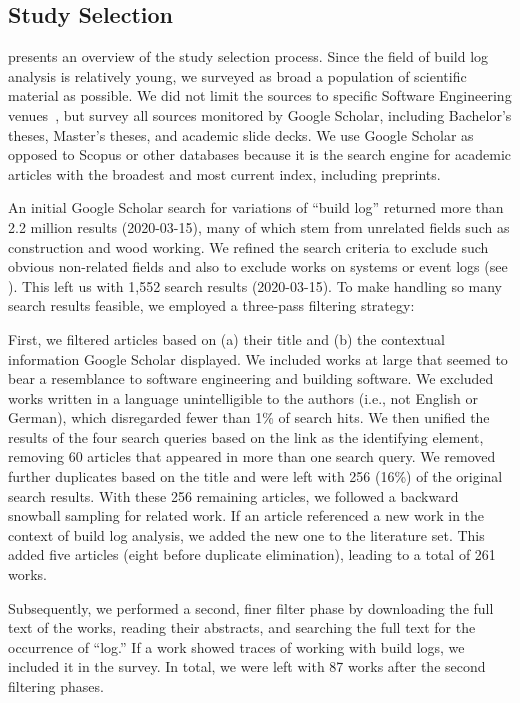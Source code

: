 \subsection{Study Selection}
 presents an overview of the study selection
process.
Since the field of build log analysis is relatively young, we
surveyed as broad a population of scientific material as possible.
We did not limit the sources to specific Software Engineering
venues~\cite{petersen2015guidelines}, but survey all sources
monitored by Google Scholar, including Bachelor's theses, Master's
theses, and academic slide decks.
We use Google Scholar as opposed to Scopus or
other databases because it is the search engine for academic articles with
the broadest and most current index, including preprints.

An initial Google Scholar search for variations of ``build log''
returned more than 2.2 million results (2020-03-15), many of which stem
from unrelated fields such as construction and wood working.
We refined the search criteria to exclude such obvious
non-related fields and also to exclude works on systems
or event logs (see ).
This left us with 1,552 search results
(2020-03-15).
To make handling so many search results feasible, we employed a
three-pass filtering strategy:

First, we filtered articles based on (a) their title and (b) the
contextual information Google Scholar displayed.
We included works at large that seemed to bear a resemblance to software
engineering and building software.
We excluded works written in a language unintelligible to the authors
(i.e., not English or German), which disregarded fewer than 1\% of search
hits.
We then unified
the results of the four search queries based on the link as the
identifying element, removing 60 articles that appeared in more than
one search query.
We removed further duplicates based on the title and were
left with 256 (16\%) of the original search results.
With these 256 remaining articles, we followed a backward snowball
sampling for related work.
If an article referenced a new work in the context
of build log analysis, we added the new one to the literature set.
This added five articles (eight before
duplicate elimination), leading to a total of 261
works.

Subsequently, we performed a second, finer filter phase by downloading the
full text of the works, reading their abstracts, and searching the
full text
for the occurrence of ``log.''
If a work showed traces of
working with build logs, we included it in the survey.
In total, we
were left with 87 works after the second filtering phases.

